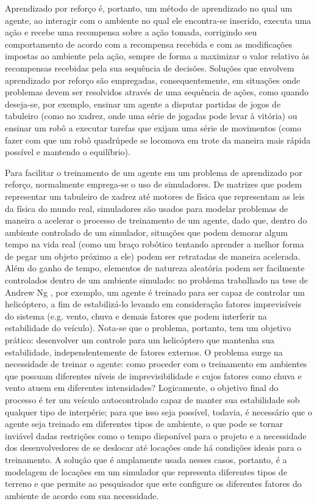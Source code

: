 \documentclass[cic,tc]{iiufrgs}
\begin{document}
%

Aprendizado por reforço é, portanto, um método de aprendizado no qual um agente,
ao interagir com o ambiente no qual ele encontra-se inserido, executa uma ação e
recebe uma recompensa sobre a ação tomada, corrigindo seu comportamento de
acordo com a recompensa recebida e com as modificações impostas ao ambiente pela
ação, sempre de forma a maximizar o valor relativo às recompensas recebidas pela
sua sequência de decisões. Soluções que envolvem aprendizado por reforço são
empregadas, consequentemente, em situações onde problemas devem ser resolvidos
através de uma sequência de ações, como quando deseja-se, por exemplo, ensinar
um agente a disputar partidas de jogos de tabuleiro (como no xadrez, onde uma
série de jogadas pode levar à vitória) ou ensinar um robô a executar tarefas que
exijam uma série de movimentos (como fazer com que um robô quadrúpede se
locomova em trote da maneira mais rápida possível e mantendo o equilíbrio).


Para facilitar o treinamento de um agente em um problema de aprendizado por
reforço, normalmente emprega-se o uso de simuladores. De matrizes que podem
representar um tabuleiro de xadrez até motores de física que representam as
leis da física do mundo real, simuladores são usados para modelar problemas de
maneira a acelerar o processo de treinamento de um agente, dado que, dentro do
ambiente controlado de um simulador, situações que podem demorar algum tempo na
vida real (como um braço robótico tentando aprender a melhor forma de pegar um
objeto próximo a ele) podem ser retratadas de maneira acelerada. Além do ganho
de tempo, elementos de natureza aleatória podem ser facilmente controlados
dentro de um ambiente simulado: no problema trabalhado na tese de Andrew Ng
\cite{Ng2003}, por exemplo, um agente é treinado para ser capaz de
controlar um helicóptero, a fim de estabilizá-lo levando em consideração fatores
imprevisíveis do sistema (e.g. vento, chuva e demais fatores que podem
interferir na estabilidade do veículo). Nota-se que o problema, portanto, tem um
objetivo prático: desenvolver um controle para um helicóptero que mantenha sua
estabilidade, independentemente de fatores externos. O problema surge na
necessidade de treinar o agente: como proceder com o treinamento em ambientes
que possuam diferentes níveis de imprevisibilidade e cujos fatores como chuva
e vento atuem em diferentes intensidades? Logicamente, o objetivo final do
processo é ter um veículo autocontrolado capaz de manter sua estabilidade sob
qualquer tipo de interpérie; para que isso seja possível, todavia, é necessário
que o agente seja treinado em diferentes tipos de ambiente, o que pode se tornar
inviável dadas restrições como o tempo disponível para o projeto e a necessidade dos
desenvolvedores de se deslocar até locações onde há condições ideais para o
treinamento. A solução que é amplamente usada nesses casos, portanto, é a
modelagem de locações em um simulador que representa diferentes tipos de terreno
e que permite ao pesquisador que este configure os diferentes
fatores do ambiente de acordo com sua necessidade.
\end{document}
